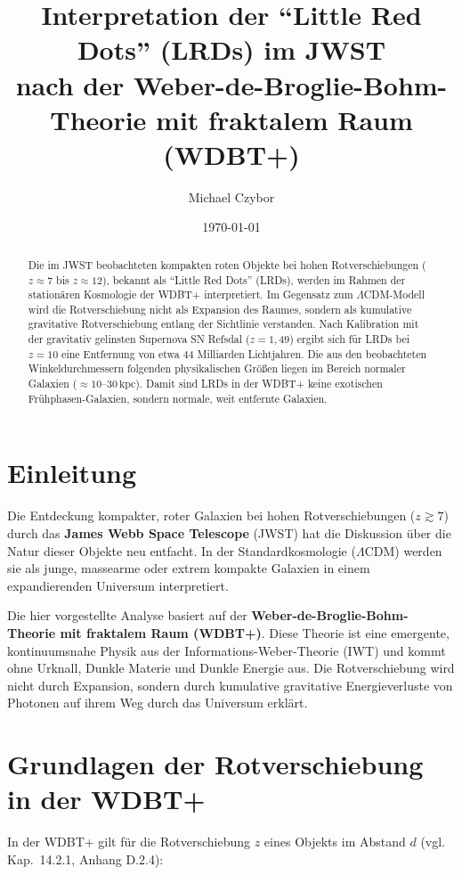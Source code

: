 \documentclass[12pt,a4paper]{article}
\title{Interpretation der ``Little Red Dots'' (LRDs) im JWST\\
nach der Weber-de-Broglie-Bohm-Theorie mit fraktalem Raum (WDBT+)}
\author{Michael Czybor}
\date{\today}
\begin{document}
\maketitle

\begin{abstract}
Die im JWST beobachteten kompakten roten Objekte bei hohen Rotverschiebungen ($z \approx 7$ bis $z \approx 12$), bekannt als ``Little Red Dots'' (LRDs), werden im Rahmen der stationären Kosmologie der WDBT+ interpretiert. Im Gegensatz zum $\Lambda$CDM-Modell wird die Rotverschiebung nicht als Expansion des Raumes, sondern als kumulative gravitative Rotverschiebung entlang der Sichtlinie verstanden. Nach Kalibration mit der gravitativ gelinsten Supernova SN Refsdal ($z = 1{,}49$) ergibt sich für LRDs bei $z = 10$ eine Entfernung von etwa $44$ Milliarden Lichtjahren. Die aus den beobachteten Winkeldurchmessern folgenden physikalischen Größen liegen im Bereich normaler Galaxien ($\approx 10$--$30\,\text{kpc}$). Damit sind LRDs in der WDBT+ keine exotischen Frühphasen-Galaxien, sondern normale, weit entfernte Galaxien.
\end{abstract}

\section{Einleitung}

Die Entdeckung kompakter, roter Galaxien bei hohen Rotverschiebungen ($z \gtrsim 7$) durch das \textbf{James Webb Space Telescope} (JWST) hat die Diskussion über die Natur dieser Objekte neu entfacht. In der Standardkosmologie ($\Lambda$CDM) werden sie als junge, massearme oder extrem kompakte Galaxien in einem expandierenden Universum interpretiert.

Die hier vorgestellte Analyse basiert auf der \textbf{Weber-de-Broglie-Bohm-Theorie mit fraktalem Raum (WDBT+)}. Diese Theorie ist eine emergente, kontinuumsnahe Physik aus der Informations-Weber-Theorie (IWT) und kommt ohne Urknall, Dunkle Materie und Dunkle Energie aus. Die Rotverschiebung wird nicht durch Expansion, sondern durch kumulative gravitative Energieverluste von Photonen auf ihrem Weg durch das Universum erklärt.

\section{Grundlagen der Rotverschiebung in der WDBT+}

In der WDBT+ gilt für die Rotverschiebung $z$ eines Objekts im Abstand $d$ (vgl. Kap.~14.2.1, Anhang D.2.4):
\end{document}
